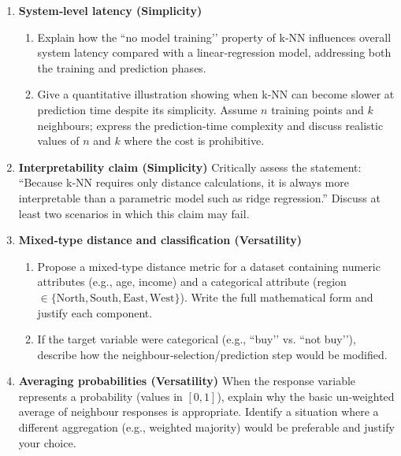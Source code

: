 \documentclass[12pt, a4paper]{article}
\begin{document}
\begin{enumerate}
    \item \textbf{System‑level latency (Simplicity)}  
    \begin{enumerate}
        \item Explain how the “no model training’’ property of k‑NN influences overall system latency compared with a linear‑regression model, addressing both the training and prediction phases.
        \item Give a quantitative illustration showing when k‑NN can become slower at prediction time despite its simplicity. Assume \(n\) training points and \(k\) neighbours; express the prediction‑time complexity and discuss realistic values of \(n\) and \(k\) where the cost is prohibitive.
    \end{enumerate}
    
    \item \textbf{Interpretability claim (Simplicity)}  
    Critically assess the statement: “Because k‑NN requires only distance calculations, it is always more interpretable than a parametric model such as ridge regression.” Discuss at least two scenarios in which this claim may fail.

    \item \textbf{Mixed‑type distance and classification (Versatility)}  
    \begin{enumerate}
        \item Propose a mixed‑type distance metric for a dataset containing numeric attributes (e.g., age, income) and a categorical attribute (region \(\in\{\text{North},\text{South},\text{East},\text{West}\}\)). Write the full mathematical form and justify each component.
        \item If the target variable were categorical (e.g., “buy’’ vs. “not buy’’), describe how the neighbour‑selection/prediction step would be modified.
    \end{enumerate}
    
    \item \textbf{Averaging probabilities (Versatility)}  
    When the response variable represents a probability (values in \([0,1]\)), explain why the basic un‑weighted average of neighbour responses is appropriate. Identify a situation where a different aggregation (e.g., weighted majority) would be preferable and justify your choice.


\end{enumerate}
\end{document}
